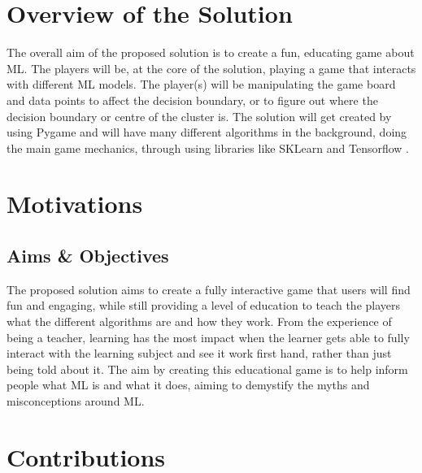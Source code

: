 	\section{Overview of the Solution}
		\label{sec:overview_of_solution}
	The overall aim of the proposed solution is to create a fun, educating game about ML. The players will be, at the core of the solution, playing a game that interacts with different ML models. The player(s) will be manipulating the game board and data points to affect the decision boundary, or to figure out where the decision boundary or centre of the cluster is. The solution will get created by using  Pygame and will have many different algorithms in the background, doing the main game mechanics, through using libraries like SKLearn \cite{sklearn_api} and Tensorflow \cite{tensorflow2015-whitepaper}.
	
		
	
	\section{Motivations}
	\label{sec:intro_motivation} 
	
	
		
		
	
	\subsection{Aims \& Objectives}
		\label{sec:intro_objective} 
		
		The proposed solution aims to create a fully interactive game that users will find fun and engaging, while still providing a level of education to teach the players what the different algorithms are and how they work. From the experience of being a teacher, learning has the most impact when the learner gets able to fully interact with the learning subject and see it work first hand, rather than just being told about it. The aim by creating this educational game is to help inform people what ML is and what it does, aiming to demystify the myths and misconceptions around ML.
		
	
	
	\section{Contributions} 
		\label{sec:intro_contribs} 
		
